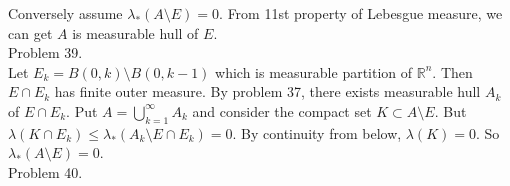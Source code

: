 Conversely assume $\lambda_{*}(A\setminus E) = 0$. From 11st property of Lebesgue measure, we can get $A$ is measurable hull of $E$.\\

Problem 39. \\

Let $E_k = B(0, k) \setminus B(0, k-1)$ which is measurable partition of $\mathbb{R}^n$. Then $E \cap E_k$ has finite outer measure. By problem 37, there exists measurable hull $A_k$ of $E \cap E_k$. Put $A = \bigcup_{k=1}^{\infty}A_k$ and consider the compact set $K \subset A \setminus E$. But $\lambda(K \cap E_k ) \leq \lambda_{*}(A_k \setminus E\cap E_k) = 0$. By continuity from below, $\lambda(K) = 0$. So $\lambda_{*}(A\setminus E) = 0$.\\

Problem 40. \\





